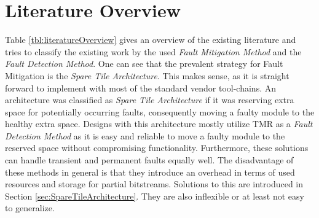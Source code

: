 \section{Literature Overview}\label{sec:literatureOverview}
Table \ref{tbl:literatureOverview} gives an overview of the existing literature and tries to classify the existing work by the used \textit{Fault Mitigation Method} and the \textit{Fault Detection Method}.
One can see that the prevalent strategy for Fault Mitigation is the \textit{Spare Tile Architecture}. 
This makes sense, as it is straight forward to implement with most of the standard vendor tool-chains.
An architecture was classified as \textit{Spare Tile Architecture} if it was reserving extra space for potentially occurring faults, consequently moving a faulty module to the healthy extra space.
Designs with this architecture mostly utilize \gls{TMR} as a \textit{Fault Detection Method} as it is easy and reliable to move a faulty module to the reserved space without compromising functionality.
Furthermore, these solutions can handle transient and permanent faults equally well.
The disadvantage of these methods in general is that they introduce an overhead in terms of used resources and storage for partial bitstreams.
Solutions to this are introduced in Section \ref{sec:SpareTileArchitecture}. 
They are also inflexible or at least not easy to generalize.

